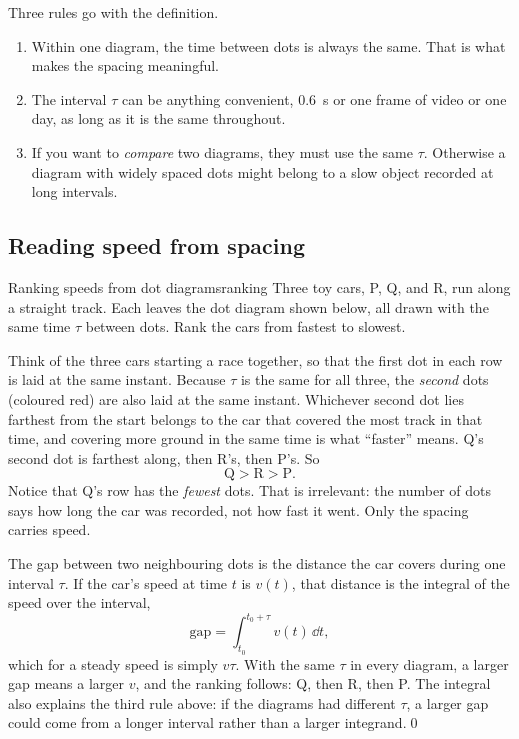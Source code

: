 Three rules go with the definition.
\begin{enumerate}
  \item Within one diagram, the time between dots is always the same. That is what makes the spacing meaningful.
  \item The interval $\tau$ can be anything convenient, \SI{0.6}{\second} or one frame of video or one day, as long as it is the same throughout.
  \item If you want to \emph{compare} two diagrams, they must use the same $\tau$. Otherwise a diagram with widely spaced dots might belong to a slow object recorded at long intervals.
\end{enumerate}

\subsection{Reading speed from spacing}

\begin{example}{Ranking speeds from dot diagrams}{ranking}
Three toy cars, P, Q, and R, run along a straight track. Each leaves the dot diagram shown below, all drawn with the same time $\tau$ between dots. Rank the cars from fastest to slowest.
\begin{center}
\end{center}

\elem Think of the three cars starting a race together, so that the first dot in each row is laid at the same instant. Because $\tau$ is the same for all three, the \emph{second} dots (coloured red) are also laid at the same instant. Whichever second dot lies farthest from the start belongs to the car that covered the most track in that time, and covering more ground in the same time is what ``faster'' means. Q's second dot is farthest along, then R's, then P's. So
\[
\text{Q} > \text{R} > \text{P}.
\]
Notice that Q's row has the \emph{fewest} dots. That is irrelevant: the number of dots says how long the car was recorded, not how fast it went. Only the spacing carries speed.

\calc The gap between two neighbouring dots is the distance the car covers during one interval $\tau$. If the car's speed at time $t$ is $v(t)$, that distance is the integral of the speed over the interval,
\[
\text{gap} = \int_{t_0}^{t_0 + \tau} v(t)\,\dd t,
\]
which for a steady speed is simply $v\tau$. With the same $\tau$ in every diagram, a larger gap means a larger $v$, and the ranking follows: Q, then R, then P. The integral also explains the third rule above: if the diagrams had different $\tau$, a larger gap could come from a longer interval rather than a larger integrand.\qed
\end{example}

